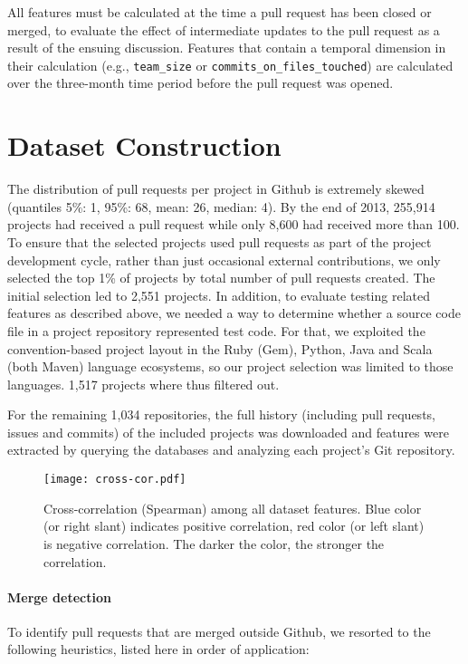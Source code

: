 \documentclass{sig-alternate}
\begin{document}
All features must be calculated at the time a pull request has been closed or
merged, to evaluate the effect of intermediate updates to the pull request as a
result of the ensuing discussion. Features that contain a temporal dimension in
their calculation (e.g., \texttt{team\_size} or
\texttt{commits\_on\_files\_touched}) are calculated over the three-month time
period before the pull request was opened.

\section{Dataset Construction}

The distribution of pull requests per project in Github is extremely skewed
(quantiles 5\%: 1, 95\%: 68, mean: 26, median: 4). By the end of 2013, 255,914
projects had received a pull request while only 8,600 had received more than
100. To ensure that the selected projects used pull requests as part of the
project development cycle, rather than just occasional external contributions,
we only selected the top 1\% of projects by total number of pull requests
created. The initial selection led to 2,551 projects.
In addition, to evaluate testing related features as described above,
we needed a way to determine whether a source code file in a project
repository represented test code.
For that, we exploited the
convention-based project layout in the Ruby (Gem), Python, Java and Scala (both
Maven) language ecosystems, so our project selection was limited to those
languages. 1,517 projects where thus filtered out.

For the remaining 1,034 repositories, the full history (including pull requests,
issues and commits) of the included projects was downloaded and features were
extracted by querying the \ghtorrent databases and analyzing each project's Git
repository.

\begin{figure}
  \begin{center}
    \texttt{[image: cross-cor.pdf]}
  \end{center}
  \caption{Cross-correlation (Spearman) among all dataset features. Blue color (or right slant) indicates positive correlation, red color (or left slant) is negative correlation. The darker the color, the stronger the correlation.}
  \label{fig:features}
\end{figure}



\paragraph*{Merge detection}
To identify pull requests that are merged outside Github, we resorted to
the following heuristics, listed here in order of application:
\end{document}
